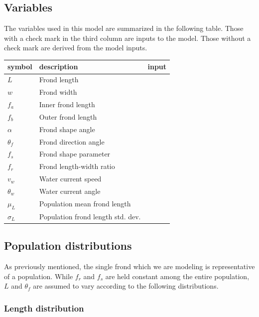 \documentclass{article}
\newenvironment{mcfig}
	{\par\medskip\noindent\minipage{\linewidth}}
	{\endminipage\par\medskip}
\begin{document}
\begin{multicols}{2}
\subsection{Variables}
The variables used in this model are summarized in the following table. Those with a check mark in the third column are inputs to the model. Those without a check mark are derived from the model inputs.
\begin{mcfig}
	\centering
	\begin{tabular}{@{}llc@{}} \toprule
		symbol       & description                         & input \\ \midrule
		$L$          & Frond length                        & \\
		$w$          & Frond width                         & \\
		$f_a$        & Inner frond length                  & \\
		$f_b$        & Outer frond length                  & \\
		$\alpha$     & Frond shape angle                   & \\
		$\theta_f$   & Frond direction angle               & \\
		$f_s$        & Frond shape parameter               & \checkmark \\
		$f_r$        & Frond length-width ratio            & \checkmark \\
		$v_w$        & Water current speed                 & \checkmark \\
		$\theta_w$   & Water current angle                 & \checkmark \\
		$\mu_L$      & Population mean frond length        & \checkmark \\
		$\sigma_L$   & Population frond length std. dev.   & \checkmark \\ \bottomrule
	\end{tabular}
	\label{fig:variables}
\end{mcfig}

\subsection{Population distributions}
As previously mentioned, the single frond which we are modeling is representative of a population.
While $f_r$ and $f_s$ are held constant among the entire population, $L$ and $\theta_f$ are assumed to vary according to the following distributions.

\subsubsection{Length distribution}


\end{multicols}
\end{document}
